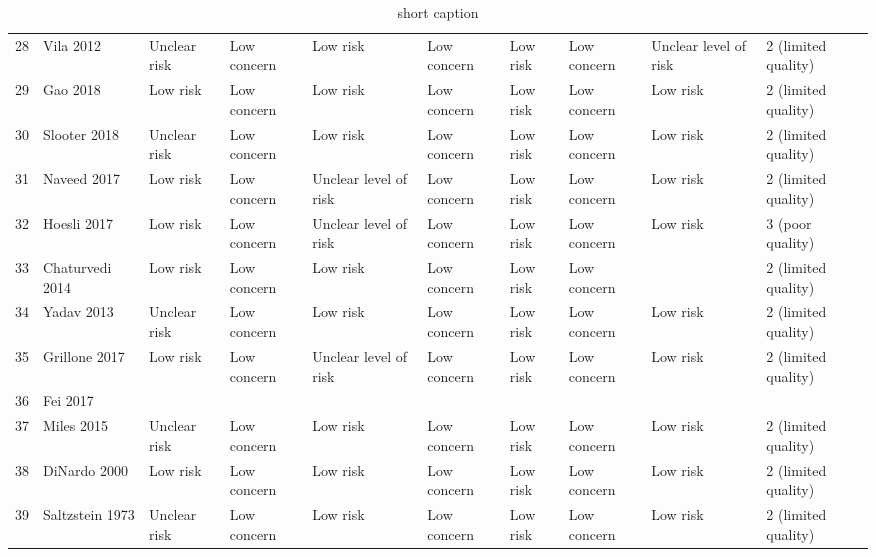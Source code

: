 \begin{table}[ht]
\begin{tabular}{rlllllllll}
  28 & Vila 2012 & Unclear risk & Low concern & Low risk & Low concern & Low risk & Low concern & Unclear level of risk & 2 (limited quality) \\ 
  29 & Gao 2018 & Low risk & Low concern & Low risk & Low concern & Low risk & Low concern & Low risk & 2 (limited quality) \\ 
  30 & Slooter 2018 & Unclear risk & Low concern & Low risk & Low concern & Low risk & Low concern & Low risk & 2 (limited quality) \\ 
  31 & Naveed 2017 & Low risk & Low concern & Unclear level of risk & Low concern & Low risk & Low concern & Low risk & 2 (limited quality) \\ 
  32 & Hoesli 2017 & Low risk & Low concern & Unclear level of risk & Low concern & Low risk & Low concern & Low risk & 3 (poor quality) \\ 
  33 & Chaturvedi 2014 & Low risk & Low concern & Low risk & Low concern & Low risk & Low concern &  & 2 (limited quality) \\ 
  34 & Yadav 2013 & Unclear risk & Low concern & Low risk & Low concern & Low risk & Low concern & Low risk & 2 (limited quality) \\ 
  35 & Grillone 2017 & Low risk & Low concern & Unclear level of risk & Low concern & Low risk & Low concern & Low risk & 2 (limited quality) \\ 
  36 & Fei 2017 &  &  &  &  &  &  &  &  \\ 
  37 & Miles 2015 & Unclear risk & Low concern & Low risk & Low concern & Low risk & Low concern & Low risk & 2 (limited quality) \\ 
  38 & DiNardo 2000 & Low risk & Low concern & Low risk & Low concern & Low risk & Low concern & Low risk & 2 (limited quality) \\ 
  39 & Saltzstein 1973 & Unclear risk & Low concern & Low risk & Low concern & Low risk & Low concern & Low risk & 2 (limited quality) \\ 
   \hline
\end{tabular}
\endgroup
\caption[full caption]{short caption} 
\label{tab:qual_scores}
\end{table}
